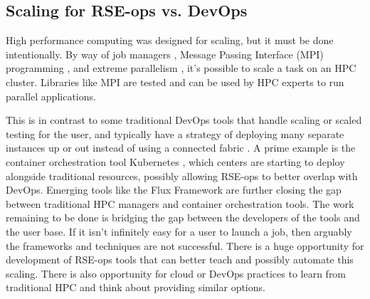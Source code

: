 \subsection{Scaling for RSE-ops vs. DevOps}

High performance computing was designed for scaling, but it must be done intentionally. By way of job managers \cite{slurm,flux}, Message Passing Interface (MPI) programming \cite{mpi}, and extreme parallelism \cite{insidehpc-hpc}, it's possible to scale a task on an HPC cluster. Libraries like MPI are tested and can be used by HPC experts to run parallel applications.

This is in contrast to some traditional DevOps tools that handle scaling or scaled testing for the user, and typically have a strategy of deploying many separate instances up or out instead of using a connected fabric \cite{Reese_undated-rm}. A prime example is the container orchestration tool Kubernetes \cite{k8}, which centers are starting to deploy alongside traditional resources, possibly allowing RSE-ops to better overlap with DevOps. Emerging tools like the Flux Framework \cite{flux} are further closing the gap between traditional HPC managers and container orchestration tools. The work remaining to be done is bridging the gap between the developers of the tools and the user base. If it isn't infinitely easy for a user to launch a job, then arguably the frameworks and techniques are not successful. There is a huge opportunity for development of RSE-ops tools that can better teach and possibly automate this scaling. There is also opportunity for cloud or DevOps practices to learn from traditional HPC and think about providing similar options.
